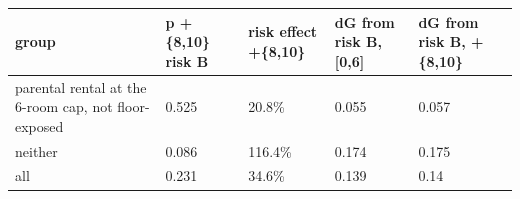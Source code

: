 \begingroup\small
\setlength{\tabcolsep}{3pt}
\renewcommand{\arraystretch}{1.04}
\begin{tabularx}{\linewidth}{XXXXX}
\toprule
group & p +\{8,10\} risk B & risk effect +\{8,10\} & dG from risk B, [0,6] & dG from risk B, +\{8,10\} \\
\midrule
parental rental at the 6-room cap, not floor-exposed & 0.525 & 20.8\% & 0.055 & 0.057 \\
neither & 0.086 & 116.4\% & 0.174 & 0.175 \\
all & 0.231 & 34.6\% & 0.139 & 0.14 \\
\bottomrule
\end{tabularx}
\endgroup
